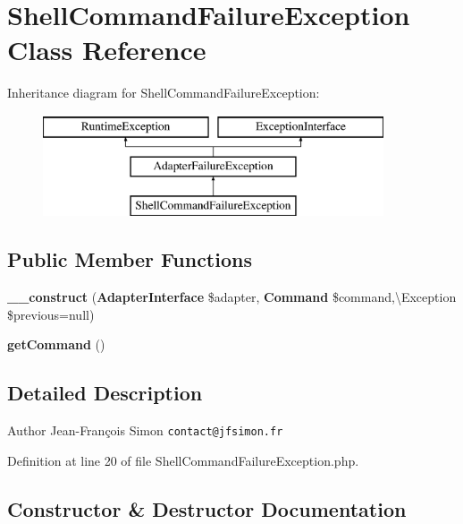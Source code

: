 \section{Shell\+Command\+Failure\+Exception Class Reference}
\label{class_symfony_1_1_component_1_1_finder_1_1_exception_1_1_shell_command_failure_exception}
Inheritance diagram for Shell\+Command\+Failure\+Exception\+:\begin{figure}[H]
\begin{center}
\leavevmode
\includegraphics[height=3.000000cm]{class_symfony_1_1_component_1_1_finder_1_1_exception_1_1_shell_command_failure_exception}
\end{center}
\end{figure}
\subsection*{Public Member Functions}
\begin{DoxyCompactItemize}
\item 
{\bf \+\_\+\+\_\+construct} ({\bf Adapter\+Interface} \$adapter, {\bf Command} \$command,\textbackslash{}Exception \$previous=null)
\item 
{\bf get\+Command} ()
\end{DoxyCompactItemize}


\subsection{Detailed Description}
\begin{DoxyAuthor}{Author}
Jean-\/\+François Simon {\tt contact@jfsimon.\+fr} 
\end{DoxyAuthor}


Definition at line 20 of file Shell\+Command\+Failure\+Exception.\+php.



\subsection{Constructor \& Destructor Documentation}
